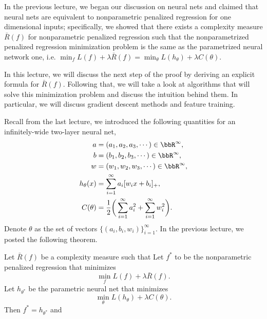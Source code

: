 
\setcounter{section}{0}


In the previous lecture, we began our discussion on neural nets and claimed that neural nets are equivalent to nonparametric penalized regression for one dimensional inputs; specifically, we showed that there exists a complexity measure $\bar{R}(f)$ for nonparametric penalized regression such that the nonparametrized penalized regression minimization problem is the same as the parametrized neural network one, i.e. $\min_{f}L(f) + \lambda \bar{R}(f) = \min_{\theta} L(h_\theta) + \lambda C(\theta)$.

In this lecture, we will discuss the next step of the proof by deriving an explicit formula for $\bar{R}(f)$. Following that, we will take a look at algorithms that will solve this minimization problem and discuss the intuition behind them. In particular, we will discuss gradient descent methods and feature training.

Recall from the last lecture, we introduced the following quantities for an infinitely-wide two-layer neural net,
\begin{align*}
a & = (a_1, a_2, a_3, \cdots) \in \bbR^\infty, \\
b & = (b_1, b_2, b_3, \cdots) \in \bbR^\infty, \\
w & = (w_1, w_2, w_3, \cdots) \in \bbR^\infty, \\
h_\theta(x) & = \sum_{i=1}^\infty a_i [w_ix+b_i]_+, \\
C(\theta) &= \frac{1}{2} \bigg(\sum_{i=1}^\infty a_i^2 + \sum_{i=1}^\infty w_i^2\bigg).
\end{align*}
Denote $\theta$ as the set of vectors $\{(a_i, b_i, w_i)\}_{i=1}^\infty$. In the previous lecture, we posted the following theorem.

\begin{theorem}\label{thm:eq}
Let $\bar{R}(f)$ be a complexity measure such that
 Let $f^*$ to be the nonparametric penalized regression that minimizes
\[
\min_f L(f)+\lambda\bar{R}(f).
\]
 Let $h_{\theta^*}$ be the parametric neural net that minimizes
\[
\min_\theta L(h_\theta)+\lambda C(\theta).
\]
Then $f^* = h_{\theta^*}$ and 
\end{theorem}

